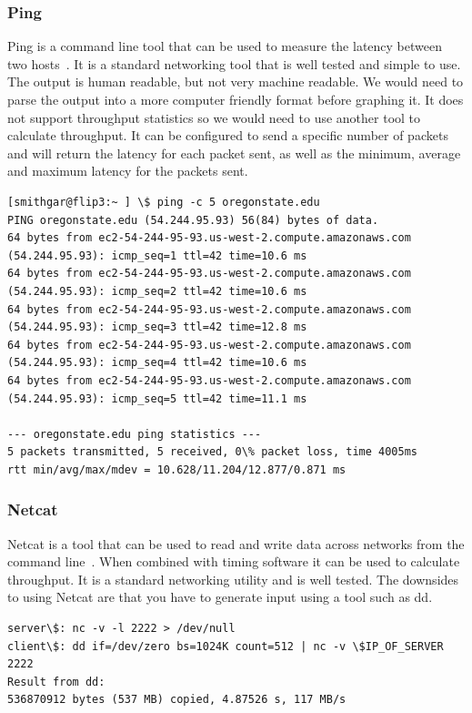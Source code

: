 \documentclass[10pt,letterpaper,onecolumn,draftclsnofoot]{IEEEtran}
\begin{document}
\subsubsection{Ping}
Ping is a command line tool that can be used to measure the latency between two hosts~\cite{ping}.
It is a standard networking tool that is well tested and simple to use.
The output is human readable, but not very machine readable. 
We would need to parse the output into a more computer friendly format before graphing it.
It does not support throughput statistics so we would need to use another tool to calculate throughput.
It can be configured to send a specific number of packets and will return the latency for each packet sent, as well as the minimum, average and maximum latency for the packets sent.
\begin{lstlisting}[caption = Example ping usage]
[smithgar@flip3:~ ] \$ ping -c 5 oregonstate.edu
PING oregonstate.edu (54.244.95.93) 56(84) bytes of data.
64 bytes from ec2-54-244-95-93.us-west-2.compute.amazonaws.com (54.244.95.93): icmp_seq=1 ttl=42 time=10.6 ms
64 bytes from ec2-54-244-95-93.us-west-2.compute.amazonaws.com (54.244.95.93): icmp_seq=2 ttl=42 time=10.6 ms
64 bytes from ec2-54-244-95-93.us-west-2.compute.amazonaws.com (54.244.95.93): icmp_seq=3 ttl=42 time=12.8 ms
64 bytes from ec2-54-244-95-93.us-west-2.compute.amazonaws.com (54.244.95.93): icmp_seq=4 ttl=42 time=10.6 ms
64 bytes from ec2-54-244-95-93.us-west-2.compute.amazonaws.com (54.244.95.93): icmp_seq=5 ttl=42 time=11.1 ms

--- oregonstate.edu ping statistics ---
5 packets transmitted, 5 received, 0\% packet loss, time 4005ms
rtt min/avg/max/mdev = 10.628/11.204/12.877/0.871 ms
\end{lstlisting}

\subsubsection{Netcat}
Netcat is a tool that can be used to read and write data across networks from the command line~\cite{netcat}.
When combined with timing software it can be used to calculate throughput.
It is a standard networking utility and is well tested.
The downsides to using Netcat are that you have to generate input using a tool such as dd.
\begin{lstlisting}[caption = Caclulating throughput with netcat and dd~\cite{nc-example}]
server\$: nc -v -l 2222 > /dev/null
client\$: dd if=/dev/zero bs=1024K count=512 | nc -v \$IP_OF_SERVER 2222
Result from dd:
536870912 bytes (537 MB) copied, 4.87526 s, 117 MB/s
\end{lstlisting}
\end{document}
